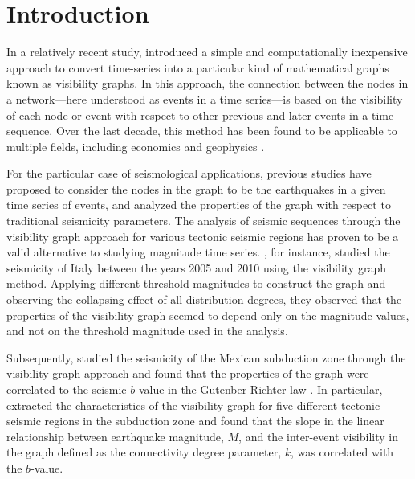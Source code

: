 
\section{Introduction}

In a relatively recent study, \citet{Lacasa2008} introduced a simple and computationally inexpensive approach to convert time-series into a particular kind of mathematical graphs known as visibility graphs. In this approach, the connection between the nodes in a network---here understood as events in a time series---is based on the visibility of each node or event with respect to other previous and later events in a time sequence. Over the last decade, this method has been found to be applicable to multiple fields, including economics and geophysics \citep[e.g.,][]{Telesca2012_CSF, Long2013, Wang2012}.

For the particular case of seismological applications, previous studies have proposed to consider the nodes in the graph to be the earthquakes in a given time series of events, and analyzed the properties of the graph with respect to traditional seismicity parameters. The analysis of seismic sequences through the visibility graph approach for various tectonic seismic regions has proven to be a valid alternative to studying magnitude time series. \citet{Telesca2012}, for instance, studied the seismicity of Italy between the years 2005 and 2010 using the visibility graph method. Applying different threshold magnitudes to construct the graph and observing the collapsing effect of all distribution degrees, they observed that the properties of the visibility graph seemed to depend only on the magnitude values, and not on the threshold magnitude used in the analysis. 

Subsequently, \citet{Telesca2013} studied the seismicity of the Mexican subduction zone through the visibility graph approach and found that the properties of the graph were correlated to the seismic $b$-value in the Gutenber-Richter law \citep{Gutenberg1944}. In particular, \citet{Telesca2013} extracted the characteristics of the visibility graph for five different tectonic seismic regions in the subduction zone and found that the slope in the linear relationship between earthquake magnitude, $M$, and the inter-event visibility in the graph defined as the connectivity degree parameter, $k$, was correlated with the $b$-value.

